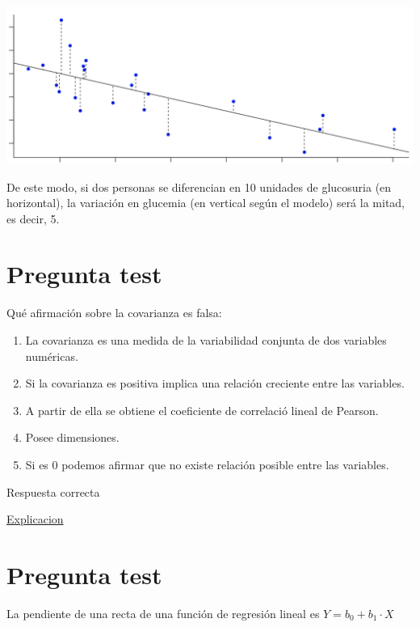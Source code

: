 \documentclass[
]{book}
\providecommand{\tightlist}{%
  \setlength{\itemsep}{0pt}\setlength{\parskip}{0pt}}
\begin{document}
\includegraphics[width=23.72in]{img/4_2}

De este modo, si dos personas se diferencian en 10 unidades de glucosuria (en horizontal), la variación en glucemia (en vertical según el modelo) será la mitad, es decir, 5.

\hypertarget{pregunta-test-135}{%
\section{Pregunta test}\label{pregunta-test-135}}

Qué afirmación sobre la covarianza es falsa:

\begin{enumerate}
\def\labelenumi{\alph{enumi})}
\tightlist
\item
  La covarianza es una medida de la variabilidad conjunta de dos variables numéricas.
\item
  Si la covarianza es positiva implica una relación creciente entre las variables.
\item
  A partir de ella se obtiene el coeficiente de correlació lineal de Pearson.
\item
  Posee dimensiones.
\item
  Si es 0 podemos afirmar que no existe relación posible entre las variables.
\end{enumerate}

Respuesta correcta

\href{https://1fjmanzano.github.io/bioestadistica/relaci\%C3\%B3n-entre-variables-nume\%CC\%81ricas.html\#covarianza}{Explicacion}

\hypertarget{pregunta-test-136}{%
\section{Pregunta test}\label{pregunta-test-136}}

La pendiente de una recta de una función de regresión lineal es \(Y = b_0 + b_1 \cdot X\)
\end{document}
